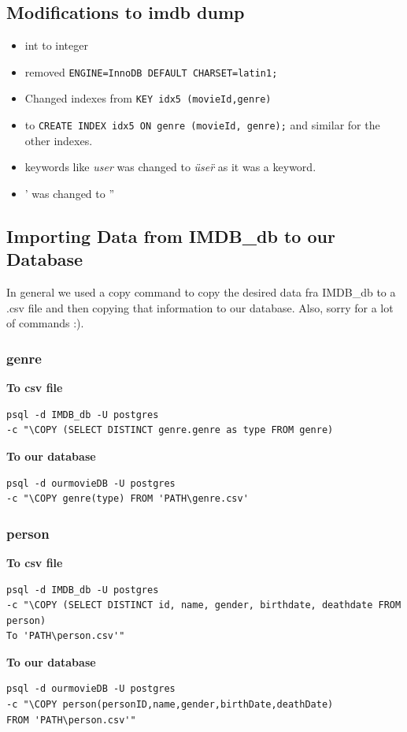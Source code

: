 \documentclass[10pt,a4paper,final]{report}
\begin{document}
\subsection*{Modifications to imdb dump}
\begin{itemize}
     \item int to integer
     \item removed \lstinline!ENGINE=InnoDB DEFAULT CHARSET=latin1;!
     \item Changed indexes from \lstinline!KEY idx5 (movieId,genre)! 
     \item[] to \lstinline!CREATE INDEX idx5 ON genre (movieId, genre);! and similar for the other indexes.
     \item keywords like \textit{user} was changed to \textit{\"user\"} as it was a keyword.
     \item ' was changed to ''
\end{itemize}

\subsection*{Importing Data from IMDB\_db to our Database}
In general we used a copy command to copy the desired data fra IMDB\_db to a .csv file and then copying that information to our database.
Also, sorry for a lot of commands :).
\subsubsection*{genre}
\textbf{To csv file}
\begin{lstlisting}
psql -d IMDB_db -U postgres 
-c "\COPY (SELECT DISTINCT genre.genre as type FROM genre)
\end{lstlisting}
\textbf{To our database}
\begin{lstlisting}
psql -d ourmovieDB -U postgres 
-c "\COPY genre(type) FROM 'PATH\genre.csv'
\end{lstlisting}

\subsubsection*{person}
\textbf{To csv file}
\begin{lstlisting}
psql -d IMDB_db -U postgres 
-c "\COPY (SELECT DISTINCT id, name, gender, birthdate, deathdate FROM person) 
To 'PATH\person.csv'"
\end{lstlisting}

\textbf{To our database}
\begin{lstlisting}
psql -d ourmovieDB -U postgres 
-c "\COPY person(personID,name,gender,birthDate,deathDate) 
FROM 'PATH\person.csv'"
\end{lstlisting}
\end{document}
